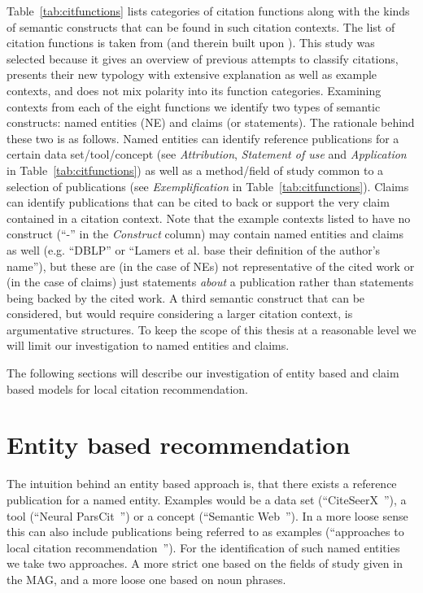 Table~\ref{tab:citfunctions} lists categories of citation functions along with the kinds of semantic constructs that can be found in such citation contexts. The list of citation functions is taken from \cite{Petric2007} (and therein built upon \cite{Thompson2001}). This study was selected because it gives an overview of previous attempts to classify citations, presents their new typology with extensive explanation as well as example contexts, and does not mix polarity into its function categories. Examining contexts from each of the eight functions we identify two types of semantic constructs: named entities (NE) and claims (or statements). The rationale behind these two is as follows. Named entities can identify reference publications for a certain data set/tool/concept (see \emph{Attribution}, \emph{Statement of use} and \emph{Application} in Table~\ref{tab:citfunctions}) as well as a method/field of study common to a selection of publications (see \emph{Exemplification} in Table~\ref{tab:citfunctions}). Claims can identify publications that can be cited to back or support the very claim contained in a citation context. Note that the example contexts listed to have no construct (``-'' in the \emph{Construct} column) may contain named entities and claims as well (e.g. ``DBLP'' or ``Lamers et al. base their definition of the author's name''), but these are (in the case of NEs) not representative of the cited work or (in the case of claims) just statements \emph{about} a publication rather than statements being backed by the cited work.
A third semantic construct that can be considered, but would require considering a larger citation context, is argumentative structures. To keep the scope of this thesis at a reasonable level we will limit our investigation to named entities and claims.

The following sections will describe our investigation of entity based and claim based models for local citation recommendation.

\section{Entity based recommendation}
The intuition behind an entity based approach is, that there exists a reference publication for a named entity. Examples would be a data set (``CiteSeerX~\cite{Caragea2014}''), a tool (``Neural ParsCit~\cite{Animesh2018}'') or a concept (``Semantic Web~\cite{Berners-Lee2001}''). In a more loose sense this can also include publications being referred to as examples (``approaches to local citation recommendation~\cite{He2010,Huang2014,Huang2015,Duma2014,Duma2016,Ebesu2017,Kobayashi2018,Jeong2019}'').
For the identification of such named entities we take two approaches. A more strict one based on the fields of study given in the MAG, and a more loose one based on noun phrases.

